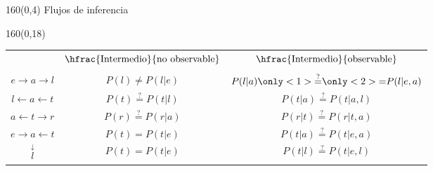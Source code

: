 \documentclass[shownotes,aspectratio=169]{beamer}
\begin{document}
\begin{frame}[plain]
 
 



\end{frame}


\begin{frame}[plain]
\begin{textblock}{160}(0,4)
\centering \Large Flujos de inferencia
\end{textblock}

\begin{textblock}{160}(0,18)
\centering
 \begin{tabular}{c c|c}
 & $\hfrac{\text{Intermedio}}{\text{no observable}}$ &   $\hfrac{\text{Intermedio}}{\text{observable}}$ \\
 & & \\
 $ e \rightarrow a \rightarrow l $    & $P(l) \neq P(l|e)$ & $P(l|a) \only<1>{\overset{?}{=}}\only<2>{\overset{\phantom{?}}{=}} P(l|e,a)$ \\ 
 $ l \leftarrow a \leftarrow t $      &  $P(t) \overset{?}{=} P(t|l)$  & $P(t|a) \overset{?}{=} P(t|a,l)$ \\ 
 $ a \leftarrow t \rightarrow r $     & $P(r) \overset{?}{=} P(r|a)$ & $P(r|t) \overset{?}{=} P(r|t,a)$ \\
 $ e \rightarrow a \leftarrow t $     & $P(t) = P(t|e)$ & $P(t|a) \overset{?}{=} P(t|e,a)$ \\
            $\overset{\downarrow}{l}$  & $P(t) = P(t|e)$ & $P(t|l) \overset{?}{=} P(t|e,l)$
 \end{tabular} 
 \end{textblock}
 

\end{frame}
\end{document}
